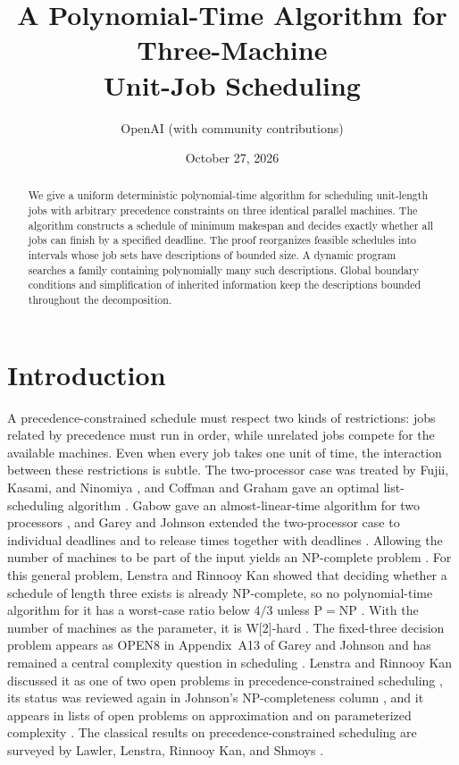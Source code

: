 \documentclass[11pt]{article}
\title{A Polynomial-Time Algorithm for Three-Machine\\
Unit-Job Scheduling}
\author{OpenAI (with community contributions)}
\date{October 27, 2026}
\numberwithin{equation}{section}
\theoremstyle{definition}
\theoremstyle{remark}
\begin{document}
\maketitle
\begin{abstract}
We give a uniform deterministic polynomial-time algorithm for scheduling
unit-length jobs with arbitrary precedence constraints on three identical
parallel machines. The algorithm constructs a schedule of minimum makespan
and decides exactly whether all jobs can finish by a specified deadline.
The proof reorganizes feasible schedules
into intervals whose job sets have descriptions of bounded size.
A dynamic program searches a family containing polynomially many such
descriptions. Global boundary conditions and simplification of inherited
information keep the descriptions bounded throughout the decomposition.
\end{abstract}

\section{Introduction}\label{sec:introduction}

A precedence-constrained schedule must respect two kinds of restrictions:
jobs related by precedence must run in order, while unrelated jobs compete
for the available machines. Even when every job takes one unit of time, the
interaction between these restrictions is subtle. The two-processor case
was treated by Fujii, Kasami, and Ninomiya
\citep{FujiiKasamiNinomiya1969,FujiiKasamiNinomiya1971Erratum}, and
Coffman and Graham gave an optimal list-scheduling algorithm
\citep{CG1972}. Gabow gave an almost-linear-time algorithm for two
processors \citep{Gabow1982}, and Garey and Johnson extended the
two-processor case to individual deadlines \citep{GareyJohnson1976} and
to release times together with deadlines \citep{GareyJohnson1977}.
Allowing the number of machines to be part of the input
yields an NP-complete problem \citep[Theorem~1]{Ullman1975}.
For this general problem, Lenstra and Rinnooy Kan showed that deciding
whether a schedule of length three exists is already NP-complete, so no
polynomial-time algorithm for it has a worst-case ratio below \(4/3\)
unless \(\mathrm{P}=\mathrm{NP}\) \citep{LenstraRinnooyKan1978}. With the
number of machines as the parameter, it is W[2]-hard
\citep{BodlaenderFellows1995}.
The fixed-three decision problem appears as OPEN8 in Appendix~A13 of
Garey and Johnson \citep{GJ1979} and has remained a central complexity
question in scheduling \citep{NSW2025}.
Lenstra and Rinnooy Kan discussed it as one of two open problems in
precedence-constrained scheduling \citep{LenstraRinnooyKan1984}, its
status was reviewed again in Johnson's NP-completeness column
\citep{Johnson2005}, and it appears in lists of open problems on
approximation \citep{SchuurmanWoeginger1999} and on parameterized
complexity \citep[Open Problem~6]{MnichVanBevern2018}. The classical
results on precedence-constrained scheduling are surveyed by Lawler,
Lenstra, Rinnooy Kan, and Shmoys \citep{LawlerLenstraRinnooyKanShmoys1993}.
\end{document}

